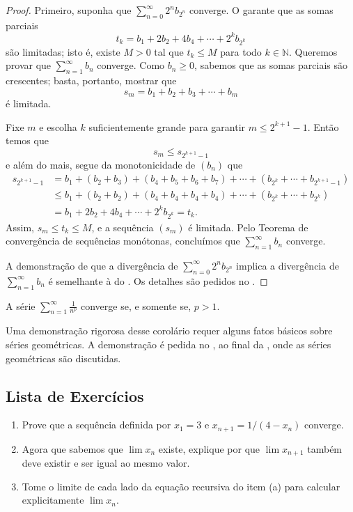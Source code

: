 \begin{proof}
Primeiro, suponha que $\sum_{n=0}^{\infty}2^n b_{2^n}$ converge. O  garante que as somas parciais
\[
t_k=b_1+2b_2+4b_4+\cdots+2^k b_{2^k}
\]
são limitadas; isto é, existe $M>0$ tal que $t_k\leq M$ para todo $k\in\mathbb{N}$. Queremos provar que $\sum_{n=1}^{\infty}b_n$ converge. Como $b_n\geq0$, sabemos que as somas parciais são crescentes; basta, portanto, mostrar que
\[
s_m=b_1+b_2+b_3+\cdots+b_m
\]
é limitada.

Fixe $m$ e escolha $k$ suficientemente grande para garantir $m\leq2^{k+1}-1$. Então 
temos que 
$$s_m\leq s_{2^{k+1}-1}$$ 
e além do mais, segue da monotonicidade de $(b_n)$ que 
\[
\begin{aligned}
s_{2^{k+1}-1}&=b_1+(b_2+b_3)+(b_4+b_5+b_6+b_7)+\cdots +(b_{2^k}+\cdots+b_{2^{k+1}-1})
\\[0.3cm]
&\leq b_1+(b_2+b_2)+(b_4+b_4+b_4+b_4)+\cdots +(b_{2^k}+\cdots+b_{2^k})
\\[0.3cm]
&=b_1+2b_2+4b_4+\cdots+2^k b_{2^k}=t_k.
\end{aligned}
\]
Assim, $s_m\leq t_k\leq M$, e a sequência $(s_m)$ é limitada. Pelo Teorema de 
convergência de sequências monótonas, concluímos que $\sum_{n=1}^{\infty}b_n$ converge.

A demonstração de que a divergência de $\sum_{n=0}^{\infty}2^n b_{2^n}$ implica a divergência de $\sum_{n=1}^{\infty}b_n$ é semelhante à do . Os detalhes são pedidos no .
\end{proof}

\begin{corollary}[$p$-Séries]\label{cor:serie-p}
A série $\displaystyle\sum_{n=1}^{\infty}\frac{1}{n^p}$ converge se, e somente se, $p>1$.
\end{corollary}

Uma demonstração rigorosa desse corolário requer alguns fatos básicos sobre séries geométricas. A demonstração é pedida no , ao final da , onde as séries geométricas são discutidas.

\subsection{Lista de Exercícios}\label{subsec:exercicios-convergencia-monotona}

\begin{exercise}\label{ex:2-4-1}
\begin{enumerate}[label=\alph*)]
\item Prove que a sequência definida por $x_1=3$ e $x_{n+1}=1/(4-x_n)$ converge.
\item Agora que sabemos que $\lim x_n$ existe, explique por que $\lim x_{n+1}$ também deve existir e ser igual ao mesmo valor.
\item Tome o limite de cada lado da equação recursiva do item (a) para calcular explicitamente $\lim x_n$.
\end{enumerate}
\end{exercise}

